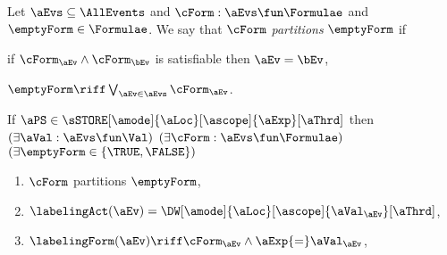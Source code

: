 \begin{definition}
  \label{def:semca}
  \label{def:partition}
  Let $\aEvs\subseteq\AllEvents$ and $\cForm:\aEvs\fun\Formulae$ and
  $\emptyForm\in\Formulae$.  We say that $\cForm$ \emph{partitions}
  $\emptyForm$ if
    \begin{enumerate*}
    \item if $\cForm_\aEv\land\cForm_\bEv$ is satisfiable then $\aEv=\bEv$,
    \item $\emptyForm\riff\bigvee_{\aEv\in\aEvs}\cForm_\aEv$.
    \end{enumerate*}

  
  \noindent
  If $\aPS \in \sSTORE[\amode]{\aLoc}[\ascope]{\aExp}[\aThrd]$ then
  $(\exists\aVal:\aEvs\fun\Val)$
  $(\exists\cForm:\aEvs\fun\Formulae)$
  $(\exists\emptyForm\in\{\TRUE,\FALSE\})$
  \begin{multicols}{2}
  \begin{enumerate}[topsep=0pt,label=(\textsc{w}\arabic*),ref=\textsc{w}\arabic*]
  \item \label{write-E-ca}
    $\cForm$ partitions $\emptyForm$,
  \item \label{write-lambda-ca}
    $\labelingAct(\aEv) = \DW[\amode]{\aLoc}[\ascope]{\aVal_\aEv}[\aThrd]$,
  \item \label{write-kappa-ca}
    \begin{math}
      \labelingForm(\aEv) \riff
      \cForm_\aEv
      \land \aExp{=}\aVal_\aEv
    \end{math},
    

\end{enumerate}
\end{multicols}
\end{definition}
